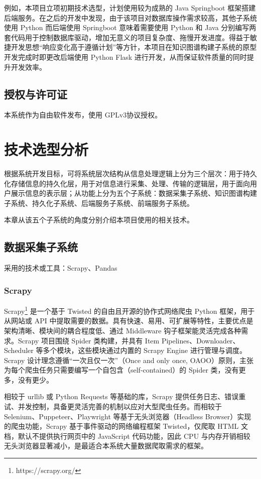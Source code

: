 \documentclass[a4paper,AutoFakeBold,oneside,12pt]{book}
\begin{document}
例如，本项目立项初期技术选型，计划使用较为成熟的 Java Springboot 框架搭建后端服务。在之后的开发中发现，由于该项目对数据库操作需求较高，其他子系统使用 Python 而后端使用 Springboot 意味着需要使用 Python 和 Java 分别编写两套代码用于控制数据库驱动，增加无意义的项目复杂度、拖慢开发进度。得益于敏捷开发思想“响应变化高于遵循计划”等方针，本项目在知识图谱构建子系统的原型开发完成时即更改后端使用 Python Flask 进行开发，从而保证软件质量的同时提升开发效率。

\section{授权与许可证}

本系统作为自由软件\cite{libre_software}发布，使用 GPLv3\cite{gpl_v3}协议授权。

\chapter{技术选型分析}

根据系统开发目标，可将系统层次结构从信息处理逻辑上分为三个层次：用于持久化存储信息的持久化层，用于对信息进行采集、处理、传输的逻辑层，用于面向用户展示信息的表示层；从功能上分为五个子系统：数据采集子系统、知识图谱构建子系统、持久化子系统、后端服务子系统、前端服务子系统。

本章从该五个子系统的角度分别介绍本项目使用的相关技术。

\section{数据采集子系统}

采用的技术或工具：Scrapy、Pandas

\subsection{Scrapy}

Scrapy\footnote{https://scrapy.org/} 是一个基于 Twisted 的自由且开源的协作式网络爬虫 Python 框架，用于从网站或 API 中提取需要的数据。具有快速、易用、可扩展等特性，主要优点是架构清晰、模块间的耦合程度低、通过 Middleware 钩子框架能灵活完成各种需求。Scrapy 项目围绕 Spider 类构建，并具有 Item Pipelines、Downloader、Scheduler 等多个模块，这些模块通过内置的 Scrapy Engine 进行管理与调度。Scrapy 设计理念遵循“一次且仅一次”（Once and only once, OAOO）原则，主张为每个爬虫任务只需要编写一个自包含（self-contained）的 Spider 类，没有更多，没有更少。

相较于 urllib 或 Python Requests 等基础的库，Scrapy 提供任务日志、错误重试、并发控制，具备更灵活完善的机制以应对大型爬虫任务。而相较于 Selenium、Puppeteer、Playwright 等基于无头浏览器（Headless Browser）实现的爬虫功能，Scrapy 基于事件驱动的网络编程框架 Twisted，仅爬取 HTML 文档，默认不提供执行网页中的 JavaScript 代码功能，因此 CPU 与内存开销相较无头浏览器显著减小，是最适合本系统大量数据爬取需求的框架。
\end{document}
